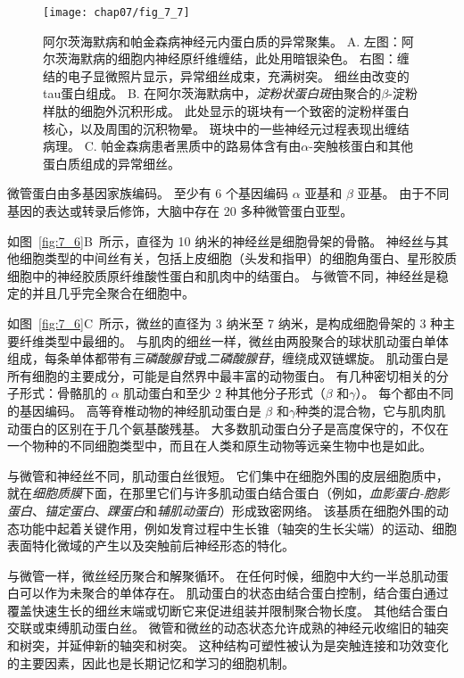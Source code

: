 \begin{figure}[htbp]
	\centering
	\texttt{[image: chap07/fig\_7\_7]}
	\caption{阿尔茨海默病和帕金森病神经元内蛋白质的异常聚集。
	A. 左图：阿尔茨海默病的细胞内神经原纤维缠结，此处用暗银染色。
	右图：缠结的电子显微照片显示，异常细丝成束，充满树突。
	细丝由改变的tau蛋白组成。
	B. 在阿尔茨海默病中，\textit{淀粉状蛋白斑}由聚合的$\beta$-淀粉样肽的细胞外沉积形成。
	此处显示的斑块有一个致密的淀粉样蛋白核心，以及周围的沉积物晕。
	斑块中的一些神经元过程表现出缠结病理。
	C. 帕金森病患者黑质中的路易体含有由$\alpha$-突触核蛋白和其他蛋白质组成的异常细丝。}
	\label{fig:7_7}
\end{figure}


微管蛋白由多基因家族编码。
至少有 6 个基因编码 $\alpha$ 亚基和 $\beta$ 亚基。
由于不同基因的表达或转录后修饰，大脑中存在 20 多种微管蛋白亚型。


如图~\ref{fig:7_6}B~所示，直径为 10 纳米的神经丝是细胞骨架的骨骼。
神经丝与其他细胞类型的中间丝有关，包括上皮细胞（头发和指甲）的细胞角蛋白、星形胶质细胞中的神经胶质原纤维酸性蛋白和肌肉中的结蛋白。
与微管不同，神经丝是稳定的并且几乎完全聚合在细胞中。


如图~\ref{fig:7_6}C~所示，微丝的直径为 3 纳米至 7 纳米，是构成细胞骨架的 3 种主要纤维类型中最细的。
与肌肉的细丝一样，微丝由两股聚合的球状肌动蛋白单体组成，每条单体都带有\textit{三磷酸腺苷}或\textit{二磷酸腺苷}，缠绕成双链螺旋。
肌动蛋白是所有细胞的主要成分，可能是自然界中最丰富的动物蛋白。
有几种密切相关的分子形式：骨骼肌的 $\alpha$ 肌动蛋白和至少 2 种其他分子形式（$\beta$ 和$\gamma$）。
每个都由不同的基因编码。
高等脊椎动物的神经肌动蛋白是 $\beta$ 和$\gamma$种类的混合物，它与肌肉肌动蛋白的区别在于几个氨基酸残基。 
大多数肌动蛋白分子是高度保守的，不仅在一个物种的不同细胞类型中，而且在人类和原生动物等远亲生物中也是如此。


与微管和神经丝不同，肌动蛋白丝很短。
它们集中在细胞外围的皮层细胞质中，就在\textit{细胞质膜}下面，在那里它们与许多肌动蛋白结合蛋白（例如，\textit{血影蛋白-胞影蛋白}、\textit{锚定蛋白}、\textit{踝蛋白}和\textit{辅肌动蛋白}）形成致密网络。
该基质在细胞外围的动态功能中起着关键作用，例如发育过程中生长锥（轴突的生长尖端）的运动、细胞表面特化微域的产生以及突触前后神经形态的特化。


与微管一样，微丝经历聚合和解聚循环。
在任何时候，细胞中大约一半总肌动蛋白可以作为未聚合的单体存在。
肌动蛋白的状态由结合蛋白控制，结合蛋白通过覆盖快速生长的细丝末端或切断它来促进组装并限制聚合物长度。 
其他结合蛋白交联或束缚肌动蛋白丝。
微管和微丝的动态状态允许成熟的神经元收缩旧的轴突和树突，并延伸新的轴突和树突。
这种结构可塑性被认为是突触连接和功效变化的主要因素，因此也是长期记忆和学习的细胞机制。


